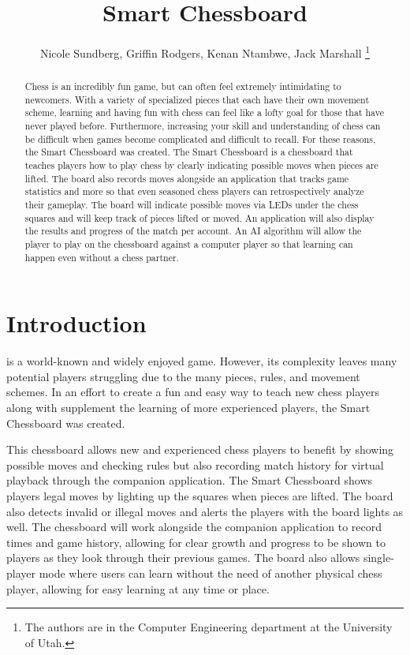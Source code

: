 \documentclass[11pt,journal]{IEEEtran}
\begin{document}
\title{Smart Chessboard}

\author{Nicole Sundberg, Griffin Rodgers, Kenan Ntambwe, Jack Marshall
  \thanks{The authors are in the Computer Engineering
    department at the University of Utah.}
}
\maketitle


\begin{abstract}
Chess is an incredibly fun game, but can often feel extremely intimidating to newcomers. With a variety of specialized pieces that each have their own movement scheme, learning and having fun with chess can feel like a lofty goal for those that have never played before. Furthermore, increasing your skill and understanding of chess can be difficult when games become complicated and difficult to recall. For these reasons, the Smart Chessboard was created.  The Smart Chessboard is a chessboard that teaches players how to play chess by clearly indicating possible moves when pieces are lifted.  The board also records moves alongside an application that tracks game statistics and more so that even seasoned chess players can retrospectively analyze their gameplay. The board will indicate possible moves via LEDs under the chess squares and will keep track of pieces lifted or moved. An application will also display the results and progress of the match per account. An AI algorithm will allow the player to play on the chessboard against a computer player so that learning can happen even without a chess partner. 
\end{abstract}

\section{Introduction}

 is a world-known and widely enjoyed game. However, its complexity leaves many potential players struggling due to the many pieces, rules, and movement schemes. In an effort to create a fun and easy way to teach new chess players along with supplement the learning of more experienced players, the Smart Chessboard was created. 

This chessboard allows new and experienced chess players to benefit by showing possible moves and checking rules but also recording match history for virtual playback through the companion application. The Smart Chessboard shows players legal moves by lighting up the squares when pieces are lifted. The board also detects invalid or illegal moves and alerts the players with the board lights as well.  The chessboard will work alongside the companion application to record times and game history, allowing for clear growth and progress to be shown to players as they look through their previous games. The board also allows single-player mode where users can learn without the need of another physical chess player, allowing for easy learning at any time or place.
\end{document}
